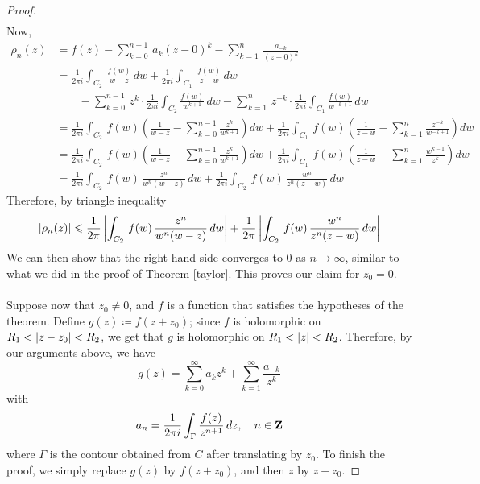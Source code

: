 \begin{proof}
\begin{align*}
\end{align*}
Now, 
\begin{align*}
\rho_n(z) &= f(z) - \sum_{k=0}^{n-1}\,a_k(z - 0)^k - \sum_{k=1}^{n}\,\frac{a_{-k}}{(z - 0)^k}\\[1em]
 &= \frac{1}{2\pi i}\int_{C_2}\,\frac{f(w)}{w - z}\,dw +\frac{1}{2\pi i} \int_{C_1}\,\frac{f(w)}{z - w}\,dw\\[0.5em]
 &\qquad - \sum_{k=0}^{n-1}\,z^k\cdot\frac{1}{2\pi i}\int_{C_2} \frac{f(w)}{w^{k+1}}\,dw - \sum_{k=1}^{n}\,z^{-k}\cdot\frac{1}{2\pi i}\int_{C_1} \frac{f(w)}{w^{-k+1}}\,dw\\[1em]
 &= \frac{1}{2\pi i} \int_{C_2}\,f(w)\left(\frac{1}{w - z} - \sum_{k=0}^{n-1}\frac{z^k}{w^{k+1}}\right) dw + \frac{1}{2\pi i} \int_{C_1}\,f(w)\left(\frac{1}{z - w} - \sum_{k=1}^{n}\frac{z^{-k}}{w^{-k+1}}\right) dw\\[1em]
 &= \frac{1}{2\pi i} \int_{C_2}\,f(w)\left(\frac{1}{w - z} - \sum_{k=0}^{n-1}\frac{z^k}{w^{k+1}}\right) dw + \frac{1}{2\pi i} \int_{C_1}\,f(w)\left(\frac{1}{z - w} - \sum_{k=1}^{n}\frac{w^{k-1}}{z^k}\right) dw\\[1em]
 &= \frac{1}{2\pi i} \int_{C_2}\,f(w)\,\frac{z^n}{w^n(w - z)}\, dw + \frac{1}{2\pi i} \int_{C_2}\,f(w)\,\frac{w^n}{z^n(z - w)}\, dw
\end{align*}
Therefore, by triangle inequality
\[\left\lvert\rho_n(z)\right\rvert \leqslant \frac{1}{2\pi} \left\lvert\int_{C_2}\,f(w)\,\frac{z^n}{w^n(w - z)}\, dw\right\rvert + \frac{1}{2\pi} \left\lvert\int_{C_2}\,f(w)\,\frac{w^n}{z^n(z - w)}\, dw\right\rvert\]
We can then show that the right hand side converges to $0$ as $n \to \infty$, similar to what we did in the proof of Theorem \ref{taylor}. This proves our claim for $z_0 = 0$.\\
\\
Suppose now that $z_0 \neq 0$, and $f$ is a function that satisfies the hypotheses of the theorem. Define $g(z) \coloneqq f(z + z_0)$; since $f$ is holomorphic on $R_1 < \left\lvert z - z_0\right\rvert < R_2$, we get that $g$ is holomorphic on $R_1 < \left\lvert z\right\rvert < R_2$. Therefore, by our arguments above, we have
\[g(z) = \sum_{k=0}^\infty a_kz^k + \sum_{k=1}^\infty\frac{a_{-k}}{z^k}\]
with
\[a_n = \frac{1}{2\pi i}\int_\Gamma \frac{f(z)}{z^{n+1}}\,dz,\quad n \in \mathbf Z\]
where $\Gamma$ is the contour obtained from $C$ after translating by $z_0$. To finish the proof, we simply replace $g(z)$ by $f(z + z_0)$, and then $z$ by $z - z_0$. 
\end{proof}

\vspace*{1em}

